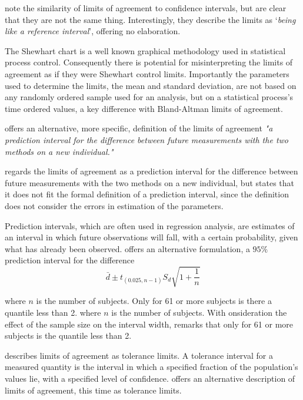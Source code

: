 \documentclass[12pt, a4paper]{report}
\theoremstyle{plain}
\theoremstyle{definition}
\theoremstyle{remark}
\begin{document}
\citet{BA99} note the similarity of limits of agreement to
confidence intervals, but are clear that they are not the same thing. Interestingly, they describe the limits as `\textit{being like a reference interval}', offering no elaboration.

The Shewhart chart is a well known graphical
methodology used in statistical process control. Consequently
there is potential for misinterpreting the limits of agreement as
if they were Shewhart control limits. Importantly the
parameters used to determine the limits, the mean and standard
deviation, are not based on any  randomly ordered sample used for an analysis, but on a statistical process's time ordered values, a key difference with Bland-Altman limits of agreement.

\citet{BXC2008} offers an alternative, more specific,  definition of
the limits of agreement \emph{"a prediction interval for the
	difference between future measurements with the two methods on a
	new individual."}

\citet{BXC2008} regards the limits of agreement as a prediction
interval for the difference between future measurements with the
two methods on a new individual, but states that it does not fit
the formal definition of a prediction interval, since the
definition does not consider the errors in estimation of the
parameters. 

Prediction intervals, which are often used in
regression analysis, are estimates of an interval in which future
observations will fall, with a certain probability, given what has
already been observed. \citet{BXC2008} offers an alternative
formulation, a $95\%$ prediction interval for the difference
\begin{equation}
\bar{d} \pm t_{(0.025, n-1)}S_{d} \sqrt{1+\frac{1}{n}}
\end{equation}

\noindent where $n$ is the number of subjects. Only for 61 or more
subjects is there a quantile less than 2.
\noindent where $n$ is the number of subjects. With onsideration the effect of the sample size on the interval
width, \citet{BXC2008} remarks that only for 61 or more subjects is the quantile less than 2.

\citet{luiz} describes limits of agreement as tolerance limits. A
tolerance interval for a measured quantity is the interval in
which a specified fraction of the population's values lie, with a
specified level of confidence. \citet{luiz} offers an alternative description of limits of agreement, this time as tolerance limits. 
\end{document}
